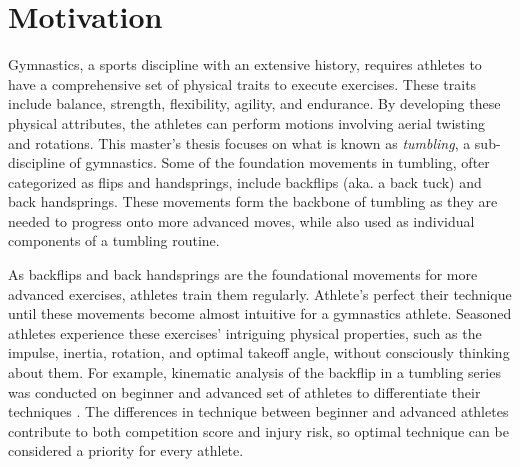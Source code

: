 \section{Motivation}

Gymnastics, a sports discipline with an extensive history, requires athletes to have a comprehensive set of physical traits to execute exercises. These traits include balance, strength, flexibility, agility, and endurance. By developing these physical attributes, the athletes can perform motions involving aerial twisting and rotations. This master's thesis focuses on what is known as \textit{tumbling}, a sub-discipline of gymnastics. Some of the foundation movements in tumbling, ofter categorized as flips and handsprings, include backflips (aka. a back tuck) and back handsprings. These movements form the backbone of tumbling as they are needed to progress onto more advanced moves, while also used as individual components of a tumbling routine.

As backflips and back handsprings are the foundational movements for more advanced exercises, athletes train them regularly. Athlete's perfect their technique until these movements become almost intuitive for a gymnastics athlete. Seasoned athletes experience these exercises' intriguing physical properties, such as the impulse, inertia, rotation, and optimal takeoff angle, without consciously thinking about them. For example, kinematic analysis of the backflip in a tumbling series was conducted on beginner and advanced set of athletes to differentiate their techniques \cite{Burgess2001KINEMATICAO}. The differences in technique between beginner and advanced athletes contribute to both competition score and injury risk, so optimal technique can be considered a priority for every athlete.

